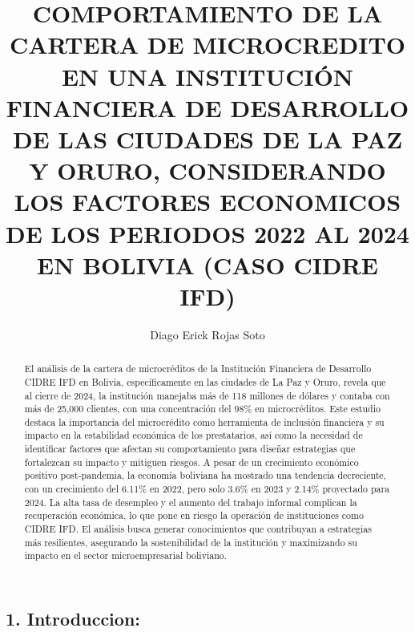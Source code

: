 \documentclass[Royal,times,sageh]{sagej}
\begin{document}

\title{COMPORTAMIENTO DE LA CARTERA DE MICROCREDITO EN UNA INSTITUCIÓN
FINANCIERA DE DESARROLLO DE LAS CIUDADES DE LA PAZ Y ORURO, CONSIDERANDO
LOS FACTORES ECONOMICOS DE LOS PERIODOS 2022 AL 2024 EN BOLIVIA (CASO
CIDRE IFD)}


\author{Diago Erick Rojas Soto}




\begin{abstract}
El análisis de la cartera de microcréditos de la Institución Financiera
de Desarrollo CIDRE IFD en Bolivia, específicamente en las ciudades de
La Paz y Oruro, revela que al cierre de 2024, la institución manejaba
más de 118 millones de dólares y contaba con más de 25,000 clientes, con
una concentración del 98\% en microcréditos. Este estudio destaca la
importancia del microcrédito como herramienta de inclusión financiera y
su impacto en la estabilidad económica de los prestatarios, así como la
necesidad de identificar factores que afectan su comportamiento para
diseñar estrategias que fortalezcan su impacto y mitiguen riesgos. A
pesar de un crecimiento económico positivo post-pandemia, la economía
boliviana ha mostrado una tendencia decreciente, con un crecimiento del
6.11\% en 2022, pero solo 3.6\% en 2023 y 2.14\% proyectado para 2024.
La alta tasa de desempleo y el aumento del trabajo informal complican la
recuperación económica, lo que pone en riesgo la operación de
instituciones como CIDRE IFD. El análisis busca generar conocimientos
que contribuyan a estrategias más resilientes, asegurando la
sostenibilidad de la institución y maximizando su impacto en el sector
microempresarial boliviano.
\end{abstract}


\maketitle

\newpage

\subsection{\texorpdfstring{1.
\textbf{Introduccion:}}{1. Introduccion:}}\label{introduccion}
\end{document}

